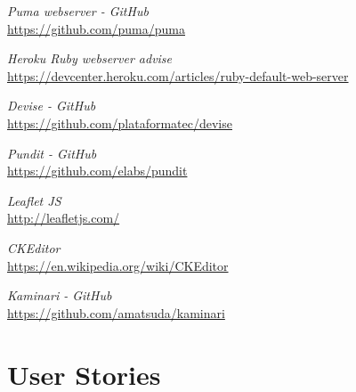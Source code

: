 \documentclass[a4paper]{article}
\begin{document}
\begin{thebibliography}{9}

\emph{Puma webserver - GitHub}\\
\url{https://github.com/puma/puma}

\emph{Heroku Ruby webserver advise}\\
\url {https://devcenter.heroku.com/articles/ruby-default-web-server}

\emph{Devise - GitHub}\\
\url{https://github.com/plataformatec/devise}

\emph{Pundit - GitHub}\\
\url{https://github.com/elabs/pundit}

\emph{Leaflet JS}\\
\url{http://leafletjs.com/}

\emph{CKEditor}\\
\url{https://en.wikipedia.org/wiki/CKEditor}

\emph{Kaminari - GitHub}\\
\url{https://github.com/amatsuda/kaminari}

\end{thebibliography}

\appendix

\section{User Stories}
\label{sec:user-stories}
\end{document}
